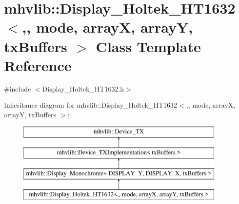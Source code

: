 \hypertarget{classmhvlib_1_1_display___holtek___h_t1632}{\section{mhvlib\-:\-:Display\-\_\-\-Holtek\-\_\-\-H\-T1632$<$,, mode, array\-X, array\-Y, tx\-Buffers $>$ Class Template Reference}
\label{classmhvlib_1_1_display___holtek___h_t1632}
}


{\ttfamily \#include $<$Display\-\_\-\-Holtek\-\_\-\-H\-T1632.\-h$>$}

Inheritance diagram for mhvlib\-:\-:Display\-\_\-\-Holtek\-\_\-\-H\-T1632$<$,, mode, array\-X, array\-Y, tx\-Buffers $>$\-:\begin{figure}[H]
\begin{center}
\leavevmode
\includegraphics[height=4.000000cm]{classmhvlib_1_1_display___holtek___h_t1632}
\end{center}
\end{figure}
